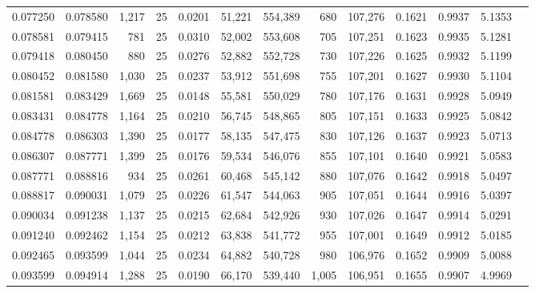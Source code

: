 \begin{tabular}{rrrrrrrrrrrrr}
0.077250 & 0.078580 & 1,217 &  25 &                                     0.0201 &  51,221 & 554,389 &     680 & 107,276 & 0.1621 & 0.9937 & 5.1353 \\
0.078581 & 0.079415 &   781 &  25 &                                     0.0310 &  52,002 & 553,608 &     705 & 107,251 & 0.1623 & 0.9935 & 5.1281 \\
0.079418 & 0.080450 &   880 &  25 &                                     0.0276 &  52,882 & 552,728 &     730 & 107,226 & 0.1625 & 0.9932 & 5.1199 \\
0.080452 & 0.081580 & 1,030 &  25 &                                     0.0237 &  53,912 & 551,698 &     755 & 107,201 & 0.1627 & 0.9930 & 5.1104 \\
0.081581 & 0.083429 & 1,669 &  25 &                                     0.0148 &  55,581 & 550,029 &     780 & 107,176 & 0.1631 & 0.9928 & 5.0949 \\
0.083431 & 0.084778 & 1,164 &  25 &                                     0.0210 &  56,745 & 548,865 &     805 & 107,151 & 0.1633 & 0.9925 & 5.0842 \\
0.084778 & 0.086303 & 1,390 &  25 &                                     0.0177 &  58,135 & 547,475 &     830 & 107,126 & 0.1637 & 0.9923 & 5.0713 \\
0.086307 & 0.087771 & 1,399 &  25 &                                     0.0176 &  59,534 & 546,076 &     855 & 107,101 & 0.1640 & 0.9921 & 5.0583 \\
0.087771 & 0.088816 &   934 &  25 &                                     0.0261 &  60,468 & 545,142 &     880 & 107,076 & 0.1642 & 0.9918 & 5.0497 \\
0.088817 & 0.090031 & 1,079 &  25 &                                     0.0226 &  61,547 & 544,063 &     905 & 107,051 & 0.1644 & 0.9916 & 5.0397 \\
0.090034 & 0.091238 & 1,137 &  25 &                                     0.0215 &  62,684 & 542,926 &     930 & 107,026 & 0.1647 & 0.9914 & 5.0291 \\
0.091240 & 0.092462 & 1,154 &  25 &                                     0.0212 &  63,838 & 541,772 &     955 & 107,001 & 0.1649 & 0.9912 & 5.0185 \\
0.092465 & 0.093599 & 1,044 &  25 &                                     0.0234 &  64,882 & 540,728 &     980 & 106,976 & 0.1652 & 0.9909 & 5.0088 \\
0.093599 & 0.094914 & 1,288 &  25 &                                     0.0190 &  66,170 & 539,440 &   1,005 & 106,951 & 0.1655 & 0.9907 & 4.9969 \\

\end{tabular}
